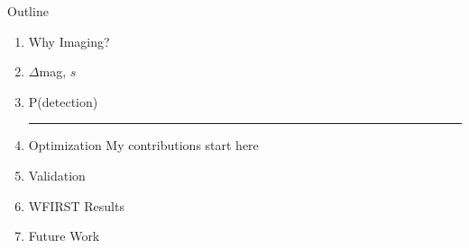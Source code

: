\documentclass[aspectratio=169]{beamer}
\begin{document}







\begin{frame}
\titlepage
\end{frame}


\begin{frame}{Outline}
\begin{enumerate}
    \item[\faRocket] Why Imaging?
    \item[\faRocket] $\Delta$mag, $s$
    \item[\faRocket] P(detection)
    \hrule
    \item[\faRocket] Optimization \quad \quad \quad \quad \quad \quad \quad \quad \quad \quad My contributions start here
    \item[\faRocket] Validation
    \item[\faRocket] WFIRST Results
    \item[\faRocket] Future Work
\end{enumerate}
\end{frame}
\end{document}
